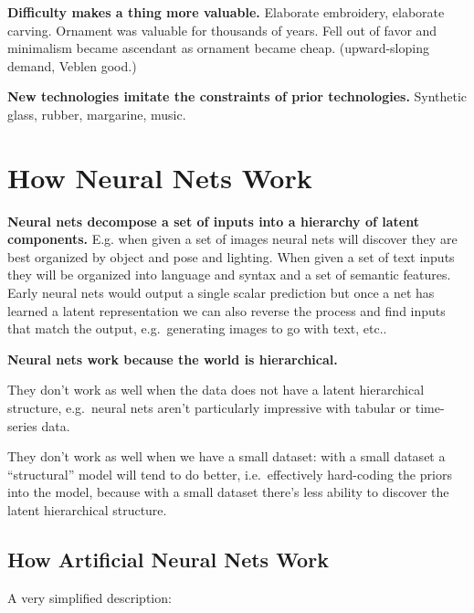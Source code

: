 \documentclass[
  11pt,
  letterpaper,
  DIV=11,
  numbers=noendperiod,
  oneside]{scrartcl}
\begin{document}
\textbf{Difficulty makes a thing more valuable.} Elaborate embroidery,
elaborate carving. Ornament was valuable for thousands of years. Fell
out of favor and minimalism became ascendant as ornament became cheap.
(upward-sloping demand, Veblen good.)

\textbf{New technologies imitate the constraints of prior technologies.}
Synthetic glass, rubber, margarine, music.

\hypertarget{how-neural-nets-work}{%
\section{How Neural Nets Work}\label{how-neural-nets-work}}

\textbf{Neural nets decompose a set of inputs into a hierarchy of latent
components.} E.g. when given a set of images neural nets will discover
they are best organized by object and pose and lighting. When given a
set of text inputs they will be organized into language and syntax and a
set of semantic features. Early neural nets would output a single scalar
prediction but once a net has learned a latent representation we can
also reverse the process and find inputs that match the output,
e.g.~generating images to go with text, etc..

\textbf{Neural nets work because the world is hierarchical.}

They don't work as well when the data does not have a latent
hierarchical structure, e.g.~neural nets aren't particularly impressive
with tabular or time-series data.

They don't work as well when we have a small dataset: with a small
dataset a ``structural'' model will tend to do better, i.e.~effectively
hard-coding the priors into the model, because with a small dataset
there's less ability to discover the latent hierarchical structure.

\hypertarget{how-artificial-neural-nets-work}{%
\subsection{How Artificial Neural Nets
Work}\label{how-artificial-neural-nets-work}}

A very simplified description:
\end{document}
